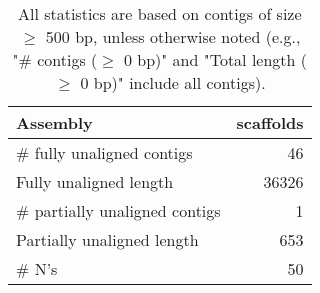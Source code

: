 \documentclass[12pt,a4paper]{article}
\begin{document}
\begin{table}[ht]
\begin{center}
\caption{All statistics are based on contigs of size $\geq$ 500 bp, unless otherwise noted (e.g., "\# contigs ($\geq$ 0 bp)" and "Total length ($\geq$ 0 bp)" include all contigs).}
\begin{tabular}{|l*{1}{|r}|}
\hline
Assembly & scaffolds \\ \hline
\# fully unaligned contigs & 46 \\ \hline
Fully unaligned length & 36326 \\ \hline
\# partially unaligned contigs & 1 \\ \hline
Partially unaligned length & 653 \\ \hline
\# N's & 50 \\ \hline
\end{tabular}
\end{center}
\end{table}
\end{document}

